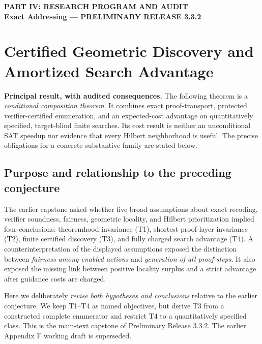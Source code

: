 \documentclass[11pt,letterpaper]{article}
\theoremstyle{definition}
\theoremstyle{remark}
\begin{document}
\setcounter{section}{14}
\begin{center}
{\small\sffamily\bfseries PART IV: RESEARCH PROGRAM AND AUDIT}\\[0.15em]
{\large\sffamily\bfseries Exact Addressing --- PRELIMINARY RELEASE 3.3.2}\\[0.3em]
\end{center}
\section{Certified Geometric Discovery and Amortized Search Advantage}\label{sec:capstone}
\noindent\textbf{Principal result, with audited consequences.}
The following theorem is a \emph{conditional composition theorem}. It combines exact proof-transport,
protected verifier-certified enumeration, and an expected-cost advantage on quantitatively
specified, target-blind finite searches. Its cost result is neither an unconditional
SAT speedup nor evidence that every Hilbert neighborhood is useful. The precise obligations
for a concrete substantive family are stated below.

\subsection{Purpose and relationship to the preceding conjecture}
The earlier capstone asked whether five broad assumptions about exact recoding, verifier soundness, fairness, geometric locality, and Hilbert prioritization implied four conclusions: theoremhood invariance (T1), shortest-proof-layer invariance (T2), finite certified discovery (T3), and fully charged search advantage (T4). A counterinterpretation of the displayed assumptions exposed the distinction between \emph{fairness among enabled actions} and \emph{generation of all proof steps}. It also exposed the missing link between positive locality surplus and a strict advantage after guidance costs are charged.

Here we deliberately \emph{revise both hypotheses and conclusions} relative to the earlier conjecture. We keep T1--T4 as named objectives, but derive T3 from a constructed complete enumerator and restrict T4 to a quantitatively specified class. This is the main-text capstone of Preliminary Release 3.3.2. The earlier Appendix F working draft is superseded.
\end{document}
